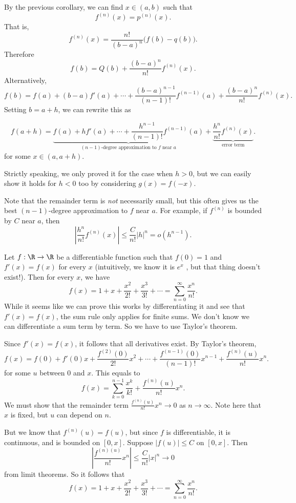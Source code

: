 \documentclass[a4paper]{article}
\begin{document}
By the previous corollary, we can find $x\in (a, b)$ such that
\[
  f^{(n)}(x) = p^{(n)}(x).
\]
That is,
\[
  f^{(n)}(x) = \frac{n!}{(b - a)^n}\big(f(b) - q(b)\big).
\]
Therefore
\[
  f(b) = Q(b) + \frac{(b - a)^n}{n!}f^{(n)}(x).
\]
Alternatively,
\[
  f(b) = f(a) + (b - a)f'(a) + \cdots + \frac{(b - a)^{n - 1}}{(n- 1)!}f^{(n - 1)}(a) + \frac{(b - a)^n}{n!}f^{(n)}(x).
\]
Setting $b = a + h$, we can rewrite this as
\begin{thm}
  \[
    f(a + h) = \underbrace{f(a) + hf'(a) + \cdots + \frac{h^{n - 1}}{(n - 1)!}f^{(n - 1)}(a)}_{(n - 1)\text{-degree approximation to }f\text{ near }a} + \underbrace{\frac{h^n}{n!}f^{(n)}(x)}_{\text{error term}}.
  \]
  for some $x\in (a, a + h)$.
\end{thm}
Strictly speaking, we only proved it for the case when $h > 0$, but we can easily show it holds for $h < 0$ too by considering $g(x) = f(-x)$.

Note that the remainder term is \emph{not} necessarily small, but this often gives us the best $(n - 1)$-degree approximation to $f$ near $a$. For example, if $f^{(n)}$ is bounded by $C$ near $a$, then
\[
  \left|\frac{h^n}{n!}f^{(n)}(x)\right| \leq \frac{C}{n!}|h|^n = o(h^{n - 1}).
\]

\begin{eg}
  Let $f: \R \to \R$ be a differentiable function such that $f(0) = 1$ and $f'(x) = f(x)$ for every $x$ (intuitively, we know it is $e^x$ , but that thing doesn't exist!). Then for every $x$, we have
  \[
    f(x) = 1 + x + \frac{x^2}{2!} + \frac{x^3}{3!} + \cdots = \sum_{n = 0}^\infty \frac{x^n}{n!}.
  \]
  While it seems like we can prove this works by differentiating it and see that $f'(x) = f(x)$, the sum rule only applies for finite sums. We don't know we can differentiate a sum term by term. So we have to use Taylor's theorem.

  Since $f'(x) =f(x)$, it follows that all derivatives exist. By Taylor's theorem,
  \[
    f(x) = f(0) + f'(0) x + \frac{f^{(2)}(0)}{2!}x^2 + \cdots + \frac{f^{(n - 1)}(0)}{(n - 1)!}x^{n - 1} + \frac{f^{(n)}(u)}{n!}x^n.
  \]
  for some $u$ between $0$ and $x$. This equals to
  \[
    f(x) = \sum_{k = 0}^{n - 1}\frac{x^k}{k!} + \frac{f^{(n)}(u)}{n!}x^n.
  \]
  We must show that the remainder term $\frac{f^{(n)}(u)}{n!}x^n \to 0$ as $n \to \infty$. Note here that $x$ is fixed, but $u$ can depend on $n$.

  But we know that $f^{(n)}(u) = f(u)$, but since $f$ is differentiable, it is continuous, and is bounded on $[0, x]$. Suppose $|f(u)| \leq C$ on $[0, x]$. Then
  \[
    \left|\frac{f^{(n)(u)}}{n!}x^n\right| \leq \frac{C}{n!}|x|^n \to 0
  \]
  from limit theorems. So it follows that
  \[
    f(x) = 1 + x + \frac{x^2}{2!} + \frac{x^3}{3!} + \cdots = \sum_{n = 0}^\infty \frac{x^n}{n!}.
  \]
\end{eg}
\end{document}
